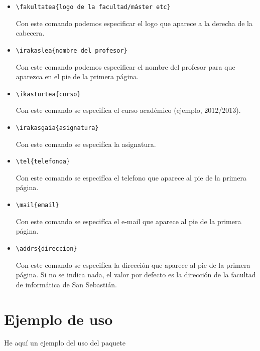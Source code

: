 \documentclass[eu]{ifirak}
\begin{document}
\begin{itemize}
\item \begin{verbatim}\fakultatea{logo de la facultad/máster etc}\end{verbatim} Con este comando podemos especificar el logo que aparece a la derecha de la cabecera.
\item \begin{verbatim}\irakaslea{nombre del profesor}\end{verbatim} Con este comando podemos especificar el nombre del profesor para que aparezca en el pie de la primera p\'agina.
\item \begin{verbatim}\ikasturtea{curso}\end{verbatim} Con este comando se especif\'ica el curso acad\'emico (ejemplo, 2012/2013).
\item \begin{verbatim}\irakasgaia{asignatura}\end{verbatim} Con este comando se especif\'ica la asignatura.
\item \begin{verbatim}\tel{telefonoa}\end{verbatim} Con este comando se especif\'ica el telefono que aparece al pie de la primera p\'agina.
\item \begin{verbatim}\mail{email}\end{verbatim} Con este comando se especif\'ica el e-mail que aparece al pie de la primera p\'agina.
\item \begin{verbatim}\addrs{direccion}\end{verbatim} Con este comando se especif\'ica la direcci\'on que aparece al pie de la primera p\'agina. Si no se indica nada, el valor por defecto es la direcci\'on de la facultad de inform\'atica de San Sebasti\'an.
\end{itemize}

\section{Ejemplo de uso}

He aqu\'i un ejemplo del uso del paquete
\end{document}
